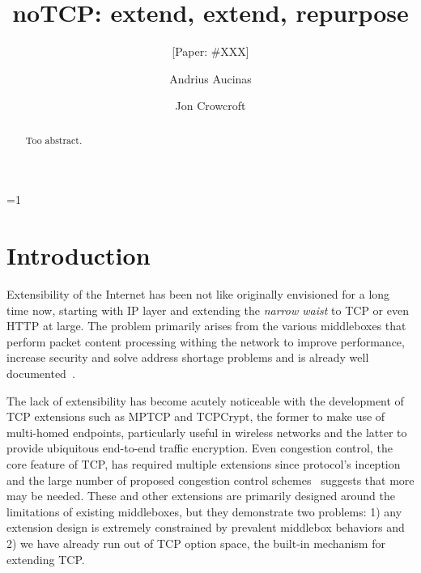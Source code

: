\documentclass{sig-alternate-10pt}
\def\anon{1}        %
\begin{document}
\date{}


\title{noTCP: extend, extend, repurpose}
\ifnum\anon=1
\author{[Paper: \#XXX]}%
\else
{}
\author{
\alignauthor Andrius Aucinas\\
\and
\alignauthor Jon Crowcroft\\
}
\fi

    
\maketitle
\begin{abstract}
Too abstract.
\end{abstract} 

\section{Introduction}
\label{section:intro}

Extensibility of the Internet has been not like originally envisioned for a long time now, starting with IP layer and extending the \emph{narrow waist} to TCP or even HTTP at large. The problem primarily arises from the various middleboxes that perform packet content processing withing the network to improve performance\cite{Kopparty:2002ht,Chakravorty:2003dm}, increase security\cite{Handley:2001vp,Vutukuru:2008fc} and solve address shortage problems and is already well documented~\cite{UntoldMiddlebox2011,Qian:2012bj,Honda:2011ci,Guha:2005tb}.

The lack of extensibility has become acutely noticeable with the development of TCP extensions such as MPTCP and TCPCrypt, the former to make use of multi-homed endpoints, particularly useful in wireless networks and the latter to provide ubiquitous end-to-end traffic encryption. Even congestion control, the core feature of TCP, has required multiple extensions since protocol's inception and the large number of proposed congestion control schemes~\cite{5462976} suggests that more may be needed. These and other extensions are primarily designed around the limitations of existing middleboxes, but they demonstrate two problems: 1) any extension design is extremely constrained by prevalent middlebox behaviors\cite{Honda:2011ci} and 2) we have already run out of TCP option space, the built-in mechanism for extending TCP.
\end{document}
